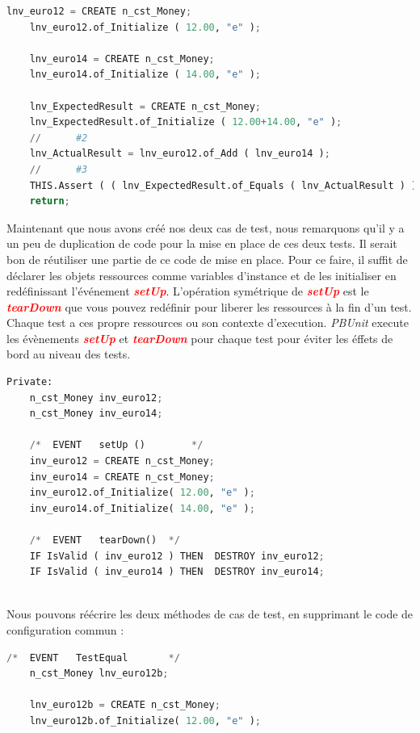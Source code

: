 \documentclass[french]{article}
\theoremstyle{definition}
\begin{document}
\begin{itemize}
\begin{lstlisting}[language=Python, caption=Test d'addition de deux \textit{money}]
    lnv_euro12 = CREATE n_cst_Money;
    lnv_euro12.of_Initialize ( 12.00, "e" );
    
    lnv_euro14 = CREATE n_cst_Money;
    lnv_euro14.of_Initialize ( 14.00, "e" );
    
    lnv_ExpectedResult = CREATE n_cst_Money;
    lnv_ExpectedResult.of_Initialize ( 12.00+14.00, "e" );
    //		#2
    lnv_ActualResult = lnv_euro12.of_Add ( lnv_euro14 );
    //		#3
    THIS.Assert ( ( lnv_ExpectedResult.of_Equals ( lnv_ActualResult ) ), true );
    return;
\end{lstlisting}
Maintenant que nous avons créé nos deux cas de test, nous remarquons qu'il y a un peu de duplication de code pour la mise en place de ces deux tests. 
 Il serait bon de réutiliser une partie de ce code de mise en place. 
 Pour ce faire, il suffit de déclarer les objets ressources comme variables d'instance et de les initialiser en redéfinissant l'événement \textit{\textbf{\textcolor{red}{setUp}}}.
 L'opération symétrique de \textit{\textbf{\textcolor{red}{setUp}}}  est le \textit{\textbf{\textcolor{red}{tearDown}}} que vous pouvez redéfinir pour liberer les ressources  à la fin d'un test. 
 Chaque test a ces propre ressources ou son contexte d'execution. \textit{PBUnit}  execute les évènements \textit{\textbf{\textcolor{red}{setUp}}} et \textit{\textbf{\textcolor{red}{tearDown}}}
 pour chaque test pour éviter les éffets de bord au niveau des tests.
 
 \begin{lstlisting}[language=Python, caption=Setup et TearDown]
    Private:
    n_cst_Money	inv_euro12;
    n_cst_Money	inv_euro14;
    
    /*	EVENT	setUp ()		*/
    inv_euro12 = CREATE n_cst_Money;
    inv_euro14 = CREATE n_cst_Money;
    inv_euro12.of_Initialize( 12.00, "e" );
    inv_euro14.of_Initialize( 14.00, "e" );
    
    /*	EVENT	tearDown()	*/
    IF IsValid ( inv_euro12 ) THEN 	DESTROY inv_euro12; 
    IF IsValid ( inv_euro14 ) THEN 	DESTROY inv_euro14;
    
\end{lstlisting}
Nous pouvons réécrire les deux méthodes de cas de test, en supprimant le code de configuration commun :

\begin{lstlisting}[language=Python, caption=Test d'egalité sans la logique du d'initialisation]
    /*	EVENT	TestEqual		*/
    n_cst_Money	lnv_euro12b;
    
    lnv_euro12b = CREATE n_cst_Money;
    lnv_euro12b.of_Initialize( 12.00, "e" );
    

\end{lstlisting}
\end{itemize}
\end{document}
